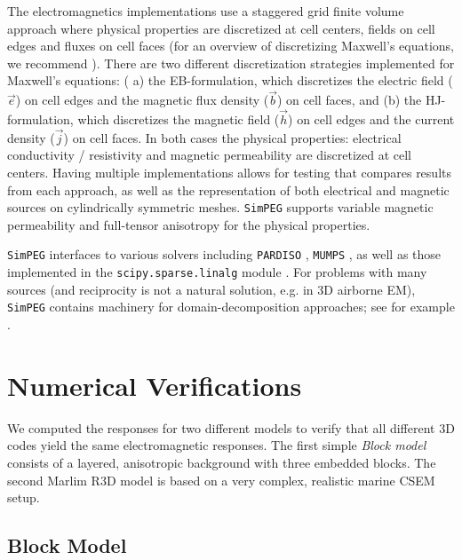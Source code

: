 \documentclass[
    paper,
  ]{geophysics}
\newcommand{\simpeg}{\texttt{SimPEG}\xspace}
\begin{document}
The electromagnetics implementations use a staggered grid finite volume
approach where physical properties are discretized at cell centers, fields on
cell edges and fluxes on cell faces \citep{IEEE.66.Yee} (for an overview of
discretizing Maxwell's equations, we recommend \cite{Haber2014b}). There are
two different discretization strategies implemented for Maxwell's equations: (
a) the EB-formulation, which discretizes the electric field ($\vec{e}$) on
cell edges and the magnetic flux density ($\vec{b}$) on cell faces, and (b)
the HJ-formulation, which discretizes the magnetic field ($\vec{h}$) on cell
edges and the current density ($\vec{j}$) on cell faces. In both cases the
physical properties: electrical conductivity / resistivity and magnetic
permeability are discretized at cell centers. Having multiple implementations
allows for testing that compares results from each approach, as well as the
representation of both electrical and magnetic sources on cylindrically
symmetric meshes. \simpeg supports variable magnetic permeability and
full-tensor anisotropy for the physical properties.


\simpeg interfaces to various solvers including \texttt{PARDISO} \citep{FGCS.04.Schenk}, \texttt{MUMPS} \citep{SIAM.01.Amestoy}, as well as those implemented in the \texttt{scipy.sparse.linalg} module \citep{NM.20.Virtanen}. For problems with many sources (and reciprocity is not a natural solution, e.g. in 3D airborne EM), \simpeg contains machinery for domain-decomposition approaches; see for example \cite{Fournier2020}.


\clearpage  %
\section{Numerical Verifications}

We computed the responses for two different models to verify that all different
3D codes yield the same electromagnetic responses. The first simple \emph{Block
model} consists of a layered, anisotropic background with three embedded
blocks. The second Marlim R3D model is based on a very complex, realistic
marine CSEM setup.

\subsection{Block Model}
\end{document}
